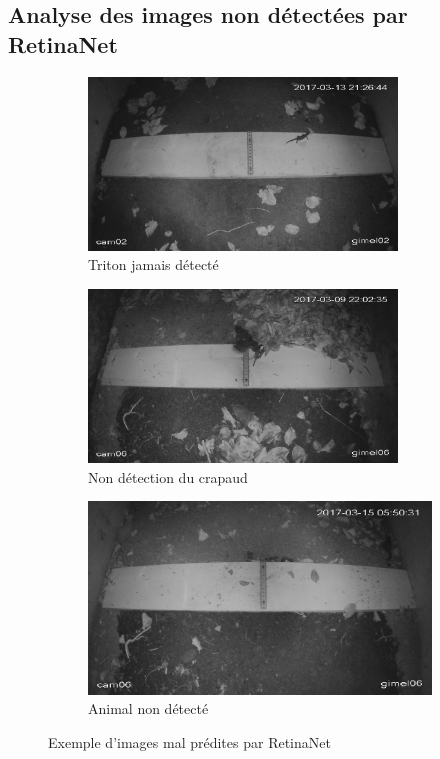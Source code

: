 \subsection{Analyse des images non détectées par RetinaNet}
\begin{figure}[H]
    \centering
    \begin{subfigure}[h]{0.49\textwidth}
        \centering
        \includegraphics[width=0.9\textwidth]{images/failed_pred3_retina.png}
        \caption{Triton jamais détecté}
        \label{fig:eval_retina_a}
    \end{subfigure}
    \begin{subfigure}[h]{0.49\textwidth}
        \centering
        \includegraphics[width=0.9\textwidth]{images/failed_pred5_retina_big.png}
        \caption{Non détection du crapaud}
        \label{fig:eval_retina_b}
    \end{subfigure}
    \begin{subfigure}[h]{0.7\textwidth}
        \centering
        \includegraphics[width=0.9\linewidth]{images/failed_pred4_retina.png}
        \caption{Animal non détecté}
        \label{fig:eval_retina_c}
    \end{subfigure}
    \caption{Exemple d'images mal prédites par RetinaNet}
    \label{fig:failed_pred_retina}
\end{figure}
